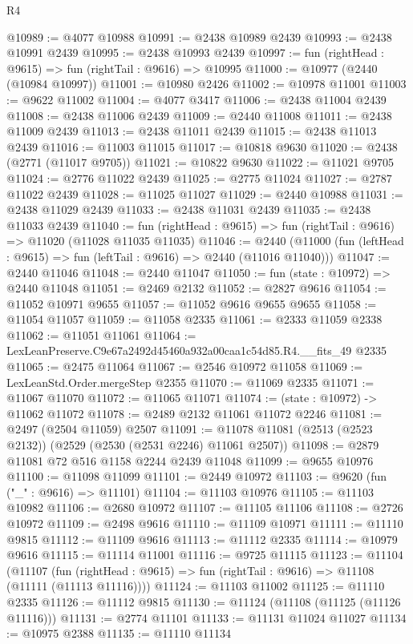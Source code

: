 \begin{lexlean}{R4}
\begin{coremodule}
@10989 := @4077 @10988
@10991 := @2438 @10989 @2439
@10993 := @2438 @10991 @2439
@10995 := @2438 @10993 @2439
@10997 := fun (rightHead : @9615) => fun (rightTail : @9616) => @10995
@11000 := @10977 (@2440 (@10984 @10997))
@11001 := @10980 @2426
@11002 := @10978 @11001
@11003 := @9622 @11002
@11004 := @4077 @3417
@11006 := @2438 @11004 @2439
@11008 := @2438 @11006 @2439
@11009 := @2440 @11008
@11011 := @2438 @11009 @2439
@11013 := @2438 @11011 @2439
@11015 := @2438 @11013 @2439
@11016 := @11003 @11015
@11017 := @10818 @9630
@11020 := @2438 (@2771 (@11017 @9705))
@11021 := @10822 @9630
@11022 := @11021 @9705
@11024 := @2776 @11022 @2439
@11025 := @2775 @11024
@11027 := @2787 @11022 @2439
@11028 := @11025 @11027
@11029 := @2440 @10988
@11031 := @2438 @11029 @2439
@11033 := @2438 @11031 @2439
@11035 := @2438 @11033 @2439
@11040 := fun (rightHead : @9615) => fun (rightTail : @9616) => @11020 (@11028 @11035 @11035)
@11046 := @2440 (@11000 (fun (leftHead : @9615) => fun (leftTail : @9616) => @2440 (@11016 @11040)))
@11047 := @2440 @11046
@11048 := @2440 @11047
@11050 := fun (state : @10972) => @2440 @11048
@11051 := @2469 @2132
@11052 := @2827 @9616
@11054 := @11052 @10971 @9655
@11057 := @11052 @9616 @9655 @9655
@11058 := @11054 @11057
@11059 := @11058 @2335
@11061 := @2333 @11059 @2338
@11062 := @11051 @11061
@11064 := LexLeanPreserve.C9e67a2492d45460a932a00caa1c54d85.R4.__fits_49 @2335
@11065 := @2475 @11064
@11067 := @2546 @10972 @11058
@11069 := LexLeanStd.Order.mergeStep @2355
@11070 := @11069 @2335
@11071 := @11067 @11070
@11072 := @11065 @11071
@11074 := (state : @10972) -> @11062 @11072
@11078 := @2489 @2132 @11061 @11072 @2246
@11081 := @2497 (@2504 @11059) @2507
@11091 := @11078 @11081 (@2513 (@2523 @2132)) (@2529 (@2530 (@2531 @2246) @11061 @2507))
@11098 := @2879 @11081 @72 @516 @1158 @2244 @2439 @11048
@11099 := @9655 @10976
@11100 := @11098 @11099
@11101 := @2449 @10972
@11103 := @9620 (fun ("_" : @9616) => @11101)
@11104 := @11103 @10976
@11105 := @11103 @10982
@11106 := @2680 @10972
@11107 := @11105 @11106
@11108 := @2726 @10972
@11109 := @2498 @9616
@11110 := @11109 @10971
@11111 := @11110 @9815
@11112 := @11109 @9616
@11113 := @11112 @2335
@11114 := @10979 @9616
@11115 := @11114 @11001
@11116 := @9725 @11115
@11123 := @11104
    (@11107 (fun (rightHead : @9615) => fun (rightTail : @9616) => @11108 (@11111 (@11113 @11116))))
@11124 := @11103 @11002
@11125 := @11110 @2335
@11126 := @11112 @9815
@11130 := @11124 (@11108 (@11125 (@11126 @11116)))
@11131 := @2774 @11101
@11133 := @11131 @11024 @11027
@11134 := @10975 @2388
@11135 := @11110 @11134

\end{coremodule}
\end{lexlean}
